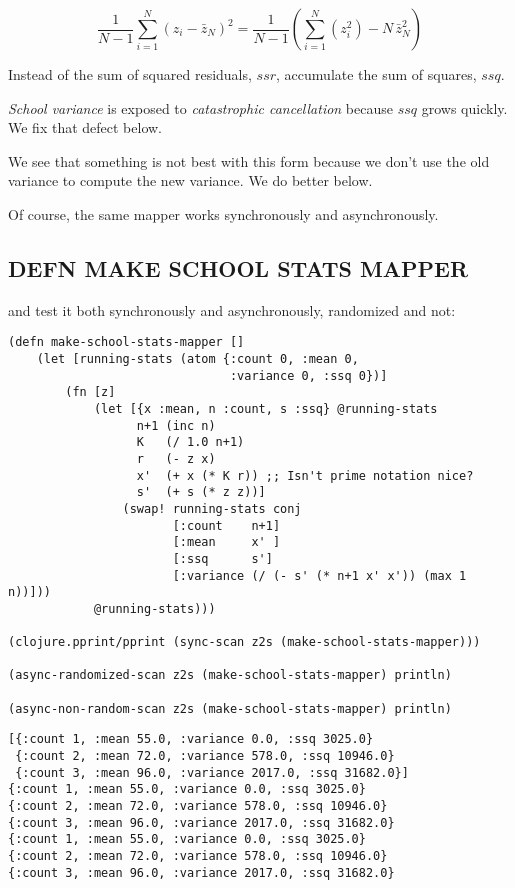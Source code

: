 \documentclass[10pt,oneside,x11names]{article}
\begin{document}
$$\frac{1}{N-1}\sum\limits_{i=1}^{N}\left({z_i-\bar{z}_N}\right)^2 =
\frac{1}{N-1}\left(\sum\limits_{i=1}^{N}\left(z_i^2\right)-N\,{\bar{z}_N^2}\right)$$

Instead of the sum of squared residuals, \(ssr\), accumulate the sum of
squares, \(ssq\).

\emph{School variance} is exposed to \emph{catastrophic cancellation} because
\(ssq\) grows quickly. We fix that defect below.

We see that something is not best with this form because we don't use
the old variance to compute the new variance. We do better below.

Of course, the same mapper works synchronously and asynchronously.

\subsection{DEFN MAKE SCHOOL STATS MAPPER}
\label{make-school-stats-mapper}
and test it both synchronously and asynchronously, randomized and not:

\begin{verbatim}
(defn make-school-stats-mapper []
    (let [running-stats (atom {:count 0, :mean 0,
                               :variance 0, :ssq 0})]
        (fn [z]
            (let [{x :mean, n :count, s :ssq} @running-stats
                  n+1 (inc n)
                  K   (/ 1.0 n+1)
                  r   (- z x)
                  x'  (+ x (* K r)) ;; Isn't prime notation nice?
                  s'  (+ s (* z z))]
                (swap! running-stats conj
                       [:count    n+1]
                       [:mean     x' ]
                       [:ssq      s']
                       [:variance (/ (- s' (* n+1 x' x')) (max 1 n))]))
            @running-stats)))

(clojure.pprint/pprint (sync-scan z2s (make-school-stats-mapper)))

(async-randomized-scan z2s (make-school-stats-mapper) println)

(async-non-random-scan z2s (make-school-stats-mapper) println)
\end{verbatim}

\begin{verbatim}
[{:count 1, :mean 55.0, :variance 0.0, :ssq 3025.0}
 {:count 2, :mean 72.0, :variance 578.0, :ssq 10946.0}
 {:count 3, :mean 96.0, :variance 2017.0, :ssq 31682.0}]
{:count 1, :mean 55.0, :variance 0.0, :ssq 3025.0}
{:count 2, :mean 72.0, :variance 578.0, :ssq 10946.0}
{:count 3, :mean 96.0, :variance 2017.0, :ssq 31682.0}
{:count 1, :mean 55.0, :variance 0.0, :ssq 3025.0}
{:count 2, :mean 72.0, :variance 578.0, :ssq 10946.0}
{:count 3, :mean 96.0, :variance 2017.0, :ssq 31682.0}
\end{verbatim}
\end{document}
